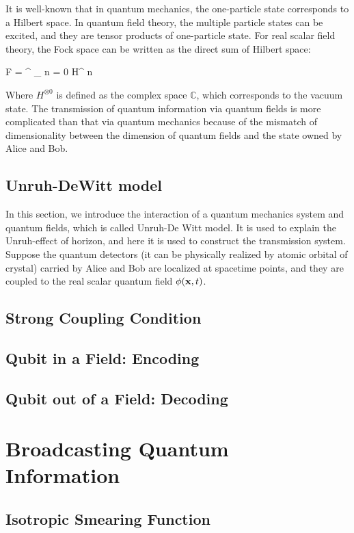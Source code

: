 \documentclass[a4paper,12pt]{article}
\begin{document}
It is well-known that in quantum mechanics, the one-particle state corresponds to a Hilbert space.
In quantum field theory, the multiple particle states can be excited, and they are tensor products of one-particle state.
For real scalar field theory, the Fock space can be written as the direct sum of Hilbert space:

\be
    F = \bigoplus^{ \infty }_{ n = 0 } H^{ \otimes n }
\ee

Where $ H^{ \otimes 0 } $ is defined as the complex space $ \mathbb{ C } $, which corresponds to the vacuum state.
The transmission of quantum information via quantum fields is more complicated than that via quantum mechanics because of the mismatch of dimensionality between the dimension of quantum fields and the state owned by Alice and Bob.

\subsection*{Unruh-DeWitt model}
In this section, we introduce the interaction of a quantum mechanics system and quantum fields, which is called Unruh-De Witt model.
It is used to explain the Unruh-effect of horizon, and here it is used to construct the transmission system.
Suppose the quantum detectors (it can be physically realized by atomic orbital of crystal) carried by Alice and Bob are localized at spacetime points, and they are coupled to the real scalar quantum field $\phi( \mathbf x, t )$.
\subsection*{Strong Coupling Condition}

\subsection*{Qubit in a Field: Encoding}

\subsection*{Qubit out of a Field: Decoding}

\section{Broadcasting Quantum Information}

\subsection*{Isotropic Smearing Function}
\end{document}
